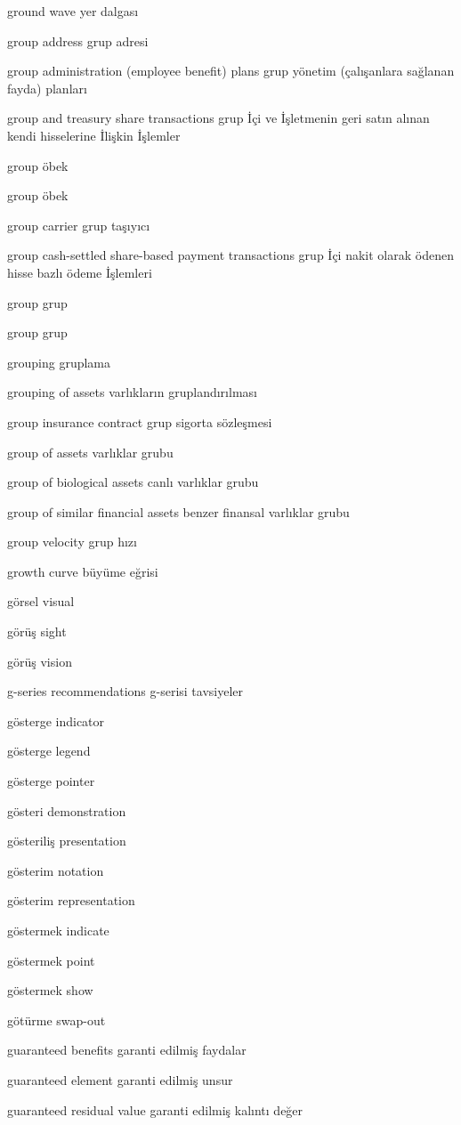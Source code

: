 \documentclass[12pt,fleqn]{article}\usepackage{../../common}
\begin{document}
ground wave yer dalgası

group address grup adresi

group administration (employee benefit) plans grup yönetim (çalışanlara sağlanan fayda) planları

group and treasury share transactions grup İçi ve İşletmenin geri satın alınan kendi hisselerine İlişkin İşlemler

group öbek

group öbek

group carrier grup taşıyıcı

group cash-settled share-based payment transactions grup İçi nakit olarak ödenen hisse bazlı ödeme İşlemleri

group grup

group grup

grouping gruplama

grouping of assets varlıkların gruplandırılması

group insurance contract grup sigorta sözleşmesi

group of assets varlıklar grubu

group of biological assets canlı varlıklar grubu

group of similar financial assets benzer finansal varlıklar grubu

group velocity grup hızı

growth curve büyüme eğrisi

görsel visual

görüş sight

görüş vision

g-series recommendations g-serisi tavsiyeler

gösterge indicator

gösterge legend

gösterge pointer

gösteri demonstration

gösteriliş presentation

gösterim notation

gösterim representation

göstermek indicate

göstermek point

göstermek show

götürme swap-out

guaranteed benefits garanti edilmiş faydalar

guaranteed element garanti edilmiş unsur

guaranteed residual value garanti edilmiş kalıntı değer
\end{document}
